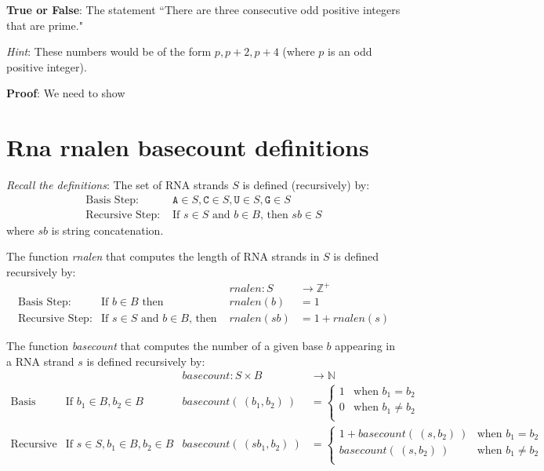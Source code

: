 \documentclass[12pt, oneside]{article}
\newcommand{\A}[0]{\texttt{A}}
\newcommand{\C}[0]{\texttt{C}}
\newcommand{\G}[0]{\texttt{G}}
\newcommand{\U}[0]{\texttt{U}}
\begin{document}
\vspace{200pt}

{\bf True or False}: The statement ``There are three consecutive odd positive integers that are prime."

{\it Hint}: These numbers would be of the form $p, p+2, p+4$ (where $p$ is an odd positive integer).

{\bf Proof}: We need to show \underline{}

\vspace{200pt}
 \vfill
\section*{Rna rnalen basecount definitions}


{\it Recall the definitions}: The set of RNA strands $S$ is defined (recursively) by:
\[
\begin{array}{ll}
\textrm{Basis Step: } & \A \in S, \C \in S, \U \in S, \G \in S \\
\textrm{Recursive Step: } & \textrm{If } s \in S\textrm{ and }b \in B \textrm{, then }sb \in S
\end{array}
\]
where $sb$ is string concatenation.

The function \textit{rnalen} that computes the length of RNA strands in $S$ is defined recursively by:
\[
\begin{array}{llll}
& & \textit{rnalen} : S & \to \mathbb{Z}^+ \\
\textrm{Basis Step:} & \textrm{If } b \in B\textrm{ then } & \textit{rnalen}(b) & = 1 \\
\textrm{Recursive Step:} & \textrm{If } s \in S\textrm{ and }b \in B\textrm{, then  } & \textit{rnalen}(sb) & = 1 + \textit{rnalen}(s)
\end{array}
\]

The function \textit{basecount} that computes the number of a given base 
$b$ appearing in a RNA strand $s$ is defined recursively by:
\[
\begin{array}{llll}
& & \textit{basecount} : S \times B & \to \mathbb{N} \\
\textrm{Basis Step:} &  \textrm{If } b_1 \in B, b_2 \in B & \textit{basecount}(~(b_1, b_2)~) & =
        \begin{cases}
            1 & \textrm{when } b_1 = b_2 \\
            0 & \textrm{when } b_1 \neq b_2 \\
        \end{cases} \\
\textrm{Recursive Step:} & \textrm{If } s \in S, b_1 \in B, b_2 \in B &\textit{basecount}(~(s b_1, b_2)~) & =
        \begin{cases}
            1 + \textit{basecount}(~(s, b_2)~) & \textrm{when } b_1 = b_2 \\
            \textit{basecount}(~(s, b_2)~) & \textrm{when } b_1 \neq b_2 \\
        \end{cases}
\end{array}
\] \vfill
\end{document}
